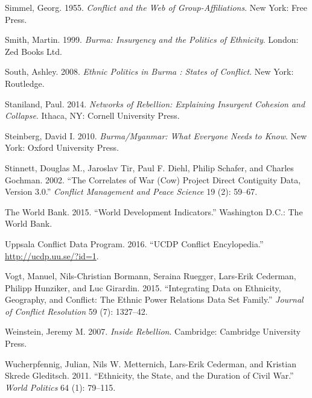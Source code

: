 \documentclass[12pt,]{book}
\theoremstyle{definition}
\theoremstyle{definition}
\theoremstyle{remark}
\begin{document}
\hypertarget{ref-Simmel1955}{}
Simmel, Georg. 1955. \emph{Conflict and the Web of Group-Affiliations}.
New York: Free Press.

\hypertarget{ref-Smith1999}{}
Smith, Martin. 1999. \emph{Burma: Insurgency and the Politics of
Ethnicity}. London: Zed Books Ltd.

\hypertarget{ref-South2008}{}
South, Ashley. 2008. \emph{Ethnic Politics in Burma : States of
Conflict}. New York: Routledge.

\hypertarget{ref-Staniland2014}{}
Staniland, Paul. 2014. \emph{Networks of Rebellion: Explaining Insurgent
Cohesion and Collapse}. Ithaca, NY: Cornell University Press.

\hypertarget{ref-Steinberg2010}{}
Steinberg, David I. 2010. \emph{Burma/Myanmar: What Everyone Needs to
Know}. New York: Oxford University Press.

\hypertarget{ref-Stinnett2002a}{}
Stinnett, Douglas M., Jaroslav Tir, Paul F. Diehl, Philip Schafer, and
Charles Gochman. 2002. ``The Correlates of War (Cow) Project Direct
Contiguity Data, Version 3.0.'' \emph{Conflict Management and Peace
Science} 19 (2): 59--67.

\hypertarget{ref-WorldBank2015}{}
The World Bank. 2015. ``World Development Indicators.'' Washington D.C.:
The World Bank.

\hypertarget{ref-UCDPEncyclopedia}{}
Uppsala Conflict Data Program. 2016. ``UCDP Conflict Encylopedia.''
\url{http://ucdp.uu.se/?id=1}.

\hypertarget{ref-Vogt2015}{}
Vogt, Manuel, Nils-Christian Bormann, Seraina Ruegger, Lars-Erik
Cederman, Philipp Hunziker, and Luc Girardin. 2015. ``Integrating Data
on Ethnicity, Geography, and Conflict: The Ethnic Power Relations Data
Set Family.'' \emph{Journal of Conflict Resolution} 59 (7): 1327--42.

\hypertarget{ref-Weinstein2007}{}
Weinstein, Jeremy M. 2007. \emph{Inside Rebellion}. Cambridge: Cambridge
University Press.

\hypertarget{ref-Wucherpfennig2011}{}
Wucherpfennig, Julian, Nils W. Metternich, Lars-Erik Cederman, and
Kristian Skrede Gleditsch. 2011. ``Ethnicity, the State, and the
Duration of Civil War.'' \emph{World Politics} 64 (1): 79--115.
\end{document}
